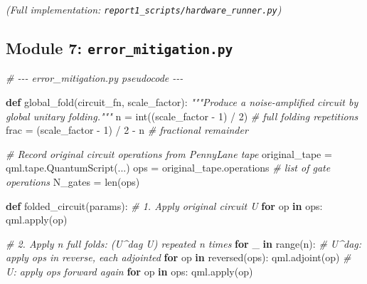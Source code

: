 \documentclass[
  11pt,
]{report}
\newenvironment{Shaded}{}{}
\newcommand{\BuiltInTok}[1]{\textcolor[rgb]{0.00,0.50,0.00}{#1}}
\newcommand{\CommentTok}[1]{\textcolor[rgb]{0.38,0.63,0.69}{\textit{#1}}}
\newcommand{\ControlFlowTok}[1]{\textcolor[rgb]{0.00,0.44,0.13}{\textbf{#1}}}
\newcommand{\DecValTok}[1]{\textcolor[rgb]{0.25,0.63,0.44}{#1}}
\newcommand{\KeywordTok}[1]{\textcolor[rgb]{0.00,0.44,0.13}{\textbf{#1}}}
\newcommand{\NormalTok}[1]{#1}
\newcommand{\OperatorTok}[1]{\textcolor[rgb]{0.40,0.40,0.40}{#1}}
\begin{document}
\emph{(Full implementation:
\texttt{report1\_scripts/hardware\_runner.py})}

\subsection{\texorpdfstring{Module 7:
\texttt{error\_mitigation.py}}{Module 7: error\_mitigation.py}}\label{module-7-error_mitigation.py}

\begin{Shaded}
\begin{Highlighting}[]
\CommentTok{\# {-}{-}{-} error\_mitigation.py pseudocode {-}{-}{-}}

\KeywordTok{def}\NormalTok{ global\_fold(circuit\_fn, scale\_factor):}
    \CommentTok{"""Produce a noise{-}amplified circuit by global unitary folding."""}
\NormalTok{    n }\OperatorTok{=} \BuiltInTok{int}\NormalTok{((scale\_factor }\OperatorTok{{-}} \DecValTok{1}\NormalTok{) }\OperatorTok{/} \DecValTok{2}\NormalTok{)           }\CommentTok{\# full folding repetitions}
\NormalTok{    frac }\OperatorTok{=}\NormalTok{ (scale\_factor }\OperatorTok{{-}} \DecValTok{1}\NormalTok{) }\OperatorTok{/} \DecValTok{2} \OperatorTok{{-}}\NormalTok{ n         }\CommentTok{\# fractional remainder}

    \CommentTok{\# Record original circuit operations from PennyLane tape}
\NormalTok{    original\_tape }\OperatorTok{=}\NormalTok{ qml.tape.QuantumScript(...)}
\NormalTok{    ops }\OperatorTok{=}\NormalTok{ original\_tape.operations              }\CommentTok{\# list of gate operations}
\NormalTok{    N\_gates }\OperatorTok{=} \BuiltInTok{len}\NormalTok{(ops)}

    \KeywordTok{def}\NormalTok{ folded\_circuit(params):}
        \CommentTok{\# 1. Apply original circuit U}
        \ControlFlowTok{for}\NormalTok{ op }\KeywordTok{in}\NormalTok{ ops:}
\NormalTok{            qml.}\BuiltInTok{apply}\NormalTok{(op)}

        \CommentTok{\# 2. Apply n full folds: (U\^{}dag U) repeated n times}
        \ControlFlowTok{for}\NormalTok{ \_ }\KeywordTok{in} \BuiltInTok{range}\NormalTok{(n):}
            \CommentTok{\# U\^{}dag: apply ops in reverse, each adjointed}
            \ControlFlowTok{for}\NormalTok{ op }\KeywordTok{in} \BuiltInTok{reversed}\NormalTok{(ops):}
\NormalTok{                qml.adjoint(op)}
            \CommentTok{\# U: apply ops forward again}
            \ControlFlowTok{for}\NormalTok{ op }\KeywordTok{in}\NormalTok{ ops:}
\NormalTok{                qml.}\BuiltInTok{apply}\NormalTok{(op)}


\end{Highlighting}
\end{Shaded}
\end{document}
